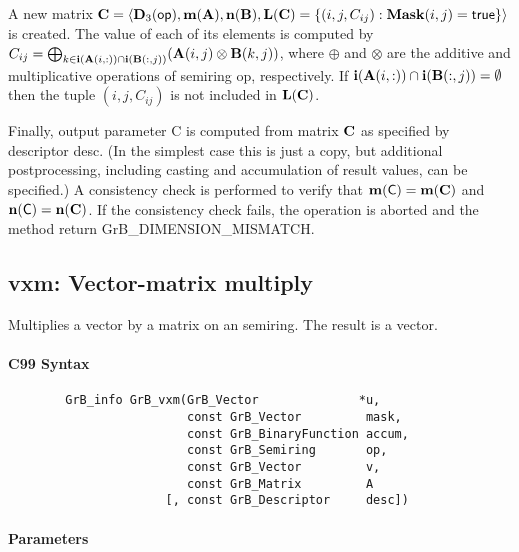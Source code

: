 A new matrix ${\bf C} = \langle \bold{D}_3({\sf op}),
\bold{m}({\bf A}), \bold{n}({\bf B}), \bold{L}({\bf C}) = \{(i,j,C_{ij}) : {\bf Mask}(i,j)
= {\sf true} \} \rangle$ is created.  The value of each of its elements
is computed by $C_{ij} = \bigoplus_{k \in {\bf i}({\bf A}(i,:)) \cap
{\bf i}({\bf B}(:,j))} ({\bf A}(i,j) \otimes {\bf B}(k,j))$,
where $\oplus$ and $\otimes$ are the additive and multiplicative
operations of semiring {\sf op}, respectively.  If ${\bf i}({\bf A}(i,:)) \cap {\bf i}({\bf B}(:,j)) = \emptyset $ then the tuple $(i,j,C_{ij})$
is not included in $\bold{L}({\bf C})$.

Finally, output parameter {\sf C} is computed from matrix ${\bf C}$
as specified by descriptor {\sf desc}. (In the simplest case this
is just a copy, but additional postprocessing, including casting and
accumulation of result values, can be specified.)  A consistency check is
performed to verify that $\bold{m}({\sf C}) = \bold{m}({\bf C})$ and $\bold{n}({\sf C}) = \bold{n}({\bf C})$. If
the consistency check fails, the operation is aborted and the method
return {\sf GrB\_DIMENSION\_MISMATCH}.

\subsection{{\sf vxm}: Vector-matrix multiply}

Multiplies a vector by a matrix on an semiring. The result is a vector.

\paragraph{C99 Syntax}

\begin{verbatim}
        GrB_info GrB_vxm(GrB_Vector              *u,
                         const GrB_Vector         mask,
                         const GrB_BinaryFunction accum,
                         const GrB_Semiring       op,
                         const GrB_Vector         v, 
                         const GrB_Matrix         A
                      [, const GrB_Descriptor     desc])
\end{verbatim}

\paragraph{Parameters}

